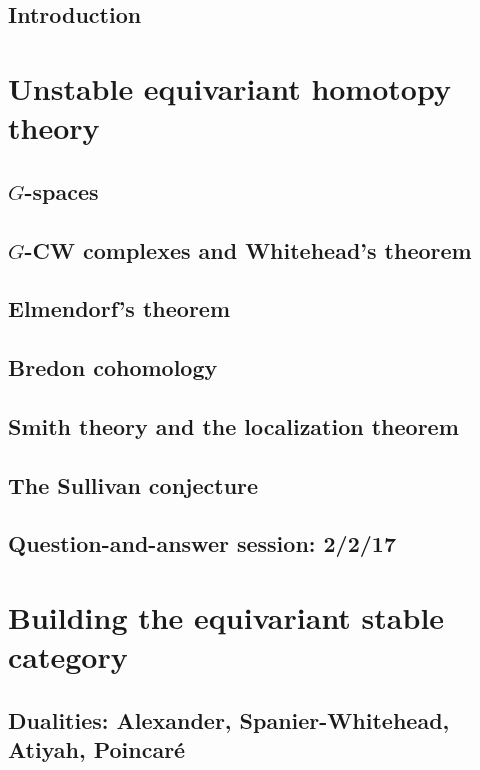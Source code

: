 \documentclass[openany]{style_EHT}
\begin{document}
\frontmatter

\frontstuff %

\section{Introduction}
	

\mainmatter

\chapter{Unstable equivariant homotopy theory}
\section{$G$-spaces}
	
\section{$G$-CW complexes and Whitehead's theorem}
	
\section{Elmendorf's theorem}
	
\section{Bredon cohomology}
	
\section{Smith theory and the localization theorem}
	
\section{The Sullivan conjecture}
	
\section{Question-and-answer session: 2/2/17}
	

\chapter{Building the equivariant stable category}
\section{Dualities: Alexander, Spanier-Whitehead, Atiyah, Poincaré}
	
\end{document}
